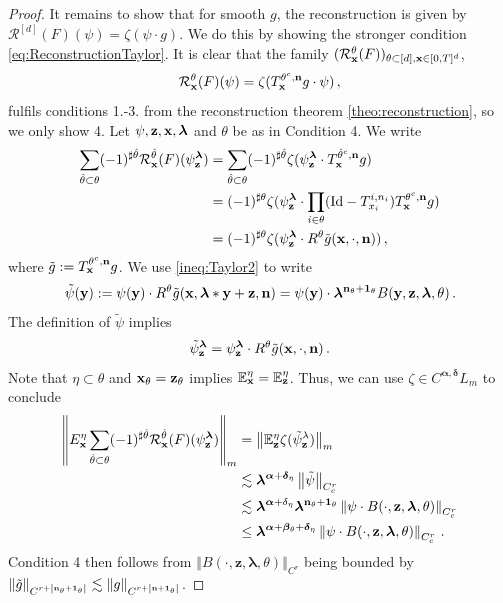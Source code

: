 \documentclass[12pt]{article}
\numberwithin{equation}{section}
\theoremstyle{plain}
\theoremstyle{definition}
\newcommand{\abs}[1]{\left\vert #1 \right\vert}
\newcommand{\norm}[1]{\left\Vert #1\right\Vert}
\newcommand{\Id}{\mbox{Id}}
\def\cR{\mathcal{R}}\def\cE{\mathcal{E}}
\def\bE{\mathbb{E}}\def\bW{\mathbb{W}}
\def\fy{\mathbf y}\def\fz{\mathbf z}
\def\falpha{{\boldsymbol\alpha}}
\def\fbeta{{\boldsymbol\beta}}
\def\fdelta{{\boldsymbol\delta}}
\def\flambda{{\boldsymbol\lambda}}
\def\fone{{\boldsymbol 1}}
\begin{document}
\begin{proof}
    It remains to show that for smooth $g$, the reconstruction is given by $\cR^{[d]} (F)(\psi) = \zeta(\psi\cdot g)$. We do this by showing the stronger condition \eqref{eq:ReconstructionTaylor}. It is clear that the family $(\cR^\theta_\fx(F))_{\theta\subset[d],\fx\in[0,T]^d}$,
    \[
        \cR^\theta_\fx(F)(\psi) = \zeta(T^{\theta^c,\fn}_\fx g\cdot\psi)\,,
    \]
    fulfils conditions 1.-3. from the reconstruction theorem \ref{theo:reconstruction}, so we only show 4. Let $\psi,\fz,\fx,\flambda$ and $\theta$ be as in Condition 4. We write
    \
    \begin{align*}
    \sum_{\hat\theta\subset\theta}(-1)^{\sharp{\hat\theta}} \mathcal{R}^{\hat\theta}_\fx(F)(\psi^{\flambda}_\fz) &= \sum_{\hat\theta\subset\theta}(-1)^{\sharp{\hat\theta}} \zeta(\psi^{\flambda}_\fz\cdot T^{\hat\theta^c,\fn}_\fx g)\\
    &=(-1)^{\sharp\theta} \zeta(\psi_\fz^\flambda\cdot\prod_{i\in\theta}(\Id-T_{x_i}^{i,n_i})T^{\theta^c,\fn}_\fx g) \\
    &= (-1)^{\sharp\theta} \zeta(\psi_\fz^\flambda\cdot R^\theta \tilde g(\fx,\cdot,\fn))\,,
    \end{align*}
    where $\tilde g := T_\mathbf x^{\theta^c,\mathbf n} g$. We use \eqref{ineq:Taylor2} to write
    \[
        \tilde\psi(\fy) := \psi(\fy)\cdot R^\theta\tilde g(\fx,\flambda*\fy+\fz,\fn) = \psi(\fy)\cdot\flambda^{\fn_\theta+\fone_\theta} B(\fy,\fz,\flambda,\theta)\,.
    \]
    The definition of $\tilde\psi$ implies
    \[
        \tilde\psi_\fz^\flambda = \psi_\fz^\flambda\cdot R^\theta \tilde g(\fx,\cdot,\fn)\,.
    \]
    Note that $\eta\subset\theta$ and $\fx_\theta = \fz_\theta$ implies $\bE^\eta_\fx = \bE^\eta_\fz$. Thus, we can use $\zeta\in C^{\falpha,\fdelta}L_m$ to conclude
    \begin{align*}
        \norm{E^\eta_\fx\sum_{\hat\theta\subset\theta}(-1)^{\sharp{\hat\theta}} \mathcal{R}^{\hat\theta}_\fx(F)(\psi^{\flambda}_\fz)}_m &= \norm{\bE_\fz^\eta \zeta(\tilde\psi_\fz^\lambda)}_m \\
        &\lesssim \flambda^{\falpha+\fdelta_\eta} \norm{\tilde\psi}_{C^r_c}\\
        &\lesssim \flambda^{\falpha+\delta_\eta} \flambda^{\fn_\theta+\fone_\theta} \norm{\psi\cdot B(\cdot,\fz,\flambda,\theta)}_{C^r_c} \\
        &\le \flambda^{\falpha+\fbeta_\theta+\fdelta_\eta} \norm{\psi\cdot B(\cdot,\fz,\flambda,\theta)}_{C^r_c}\,.
    \end{align*}
    Condition 4 then follows from $\norm{B(\cdot,\fz,\flambda,\theta)}_{C^r}$ being bounded by \\$\norm{\tilde g}_{C^{r+\abs{\fn_\theta+\fone_\theta}}} \lesssim \norm{g}_{C^{r+\abs{\fn+\fone_\theta}}}$.
\end{proof}




\end{document}
